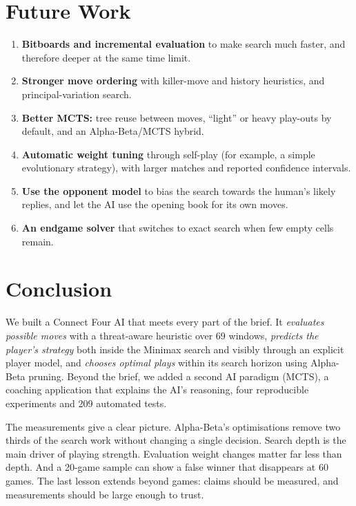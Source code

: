 \documentclass[11pt,a4paper]{article}
\begin{document}
\section{Future Work}\label{sec:future}

\begin{enumerate}
  \item \textbf{Bitboards and incremental evaluation} to make search much faster, and therefore deeper at the same time limit.
  \item \textbf{Stronger move ordering} with killer-move and history heuristics, and principal-variation search.
  \item \textbf{Better MCTS:} tree reuse between moves, ``light'' or heavy play-outs by default, and an Alpha-Beta/MCTS hybrid.
  \item \textbf{Automatic weight tuning} through self-play (for example, a simple evolutionary strategy), with larger matches and reported confidence intervals.
  \item \textbf{Use the opponent model} to bias the search towards the human's likely replies, and let the AI use the opening book for its own moves.
  \item \textbf{An endgame solver} that switches to exact search when few empty cells remain.
\end{enumerate}

\section{Conclusion}\label{sec:conclusion}

We built a Connect Four AI that meets every part of the brief. It \emph{evaluates possible moves} with a threat-aware heuristic over 69 windows, \emph{predicts the player's strategy} both inside the Minimax search and visibly through an explicit player model, and \emph{chooses optimal plays} within its search horizon using Alpha-Beta pruning. Beyond the brief, we added a second AI paradigm (MCTS), a coaching application that explains the AI's reasoning, four reproducible experiments and 209 automated tests.

The measurements give a clear picture. Alpha-Beta's optimisations remove two thirds of the search work without changing a single decision. Search depth is the main driver of playing strength. Evaluation weight changes matter far less than depth. And a 20-game sample can show a false winner that disappears at 60 games. The last lesson extends beyond games: claims should be measured, and measurements should be large enough to trust.
\end{document}
